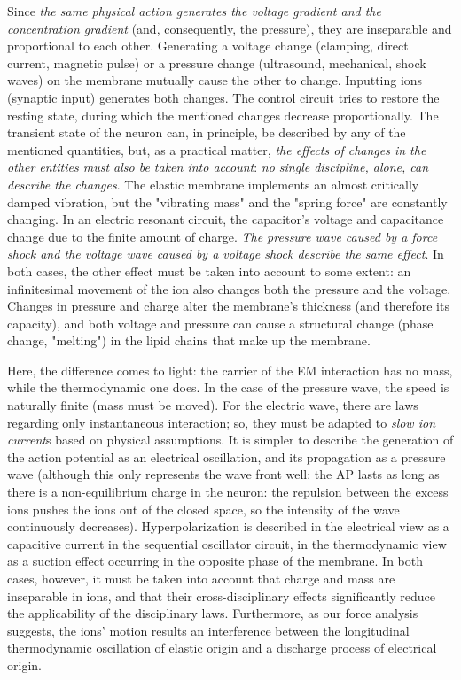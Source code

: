\ifx\magyar\undefined
Since \textit{the same physical action generates the voltage gradient and the concentration gradient} (and, consequently, the pressure), they are inseparable and proportional to each other.
Generating a voltage change (clamping, direct current, magnetic pulse) or a pressure change (ultrasound, mechanical, shock waves) on the membrane mutually cause the other to change. Inputting ions (synaptic input) generates both changes.
The control circuit tries to restore the resting state, during which the mentioned changes decrease proportionally.
The transient state of the neuron can, in principle, be described by any of the mentioned quantities, but, as a practical matter, \textit{the effects of changes in the other entities must also be taken into account}: \textit{no single discipline, alone, can describe the changes}.
The elastic membrane implements an almost critically damped vibration, but the "vibrating mass" and the "spring force" are constantly changing.
In an electric resonant circuit, the capacitor's voltage and capacitance change due to the finite amount of charge.
\textit{The pressure wave caused by a force shock and the voltage wave caused by a voltage shock describe the same effect}.
In both cases, the other effect must be taken into account to some extent: an infinitesimal movement of the ion also changes both the pressure and the voltage.
Changes in pressure and charge alter the membrane's thickness (and therefore its capacity), and both voltage and pressure can cause a structural change (phase change, "melting") in the lipid chains that make up the membrane.


Here, the difference comes to light: the carrier of the \gls{EM} interaction has no mass, while the thermodynamic one does.
In the case of the pressure wave, the speed is naturally finite (mass must be moved). For the electric wave, there are laws regarding only instantaneous interaction; so, they must be adapted to \textit{slow ion current}s based on physical assumptions.
It is simpler to describe the generation of the action potential as an electrical oscillation, and its propagation as a pressure wave (although this only represents the wave front well:
the \gls{AP} lasts as long as there is a non-equilibrium charge in the neuron: the repulsion between the excess ions pushes the ions out of the closed space, so the intensity of the wave continuously decreases).
Hyperpolarization is described in the electrical view as a capacitive current in the sequential oscillator circuit, in the thermodynamic view as a suction effect occurring in the opposite phase of the membrane. 
In both cases, however, it must be taken into account that charge and mass are inseparable in ions, and that their cross-disciplinary effects significantly reduce the applicability of the disciplinary laws.
Furthermore, as our force analysis suggests, the ions' motion results 
an interference between the longitudinal thermodynamic oscillation of elastic origin
and a discharge process of electrical origin. 


